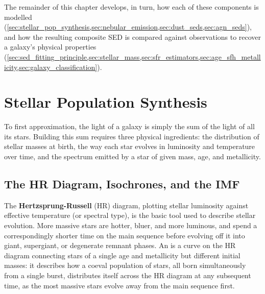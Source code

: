 \medskip

The remainder of this chapter develops, in turn, how each of these components is modelled (\cref{sec:stellar_pop_synthesis,sec:nebular_emission,sec:dust_seds,sec:agn_seds}), and how the resulting composite SED is compared against observations to recover a galaxy's physical properties (\cref{sec:sed_fitting_principle,sec:stellar_mass,sec:sfr_estimators,sec:age_sfh_metallicity,sec:galaxy_classification}).

\section{Stellar Population Synthesis} \label{sec:stellar_pop_synthesis}

To first approximation, the light of a galaxy is simply the sum of the light of all its stars. Building this sum requires three physical ingredients: the distribution of stellar masses at birth, the way each star evolves in luminosity and temperature over time, and the spectrum emitted by a star of given mass, age, and metallicity.

\subsection{The HR Diagram, Isochrones, and the IMF} \label{subsec:hr_isochrones}

\begin{minipage}{0.56\textwidth}
The \textbf{Hertzsprung-Russell} (HR) diagram, plotting stellar luminosity against effective temperature (or spectral type), is the basic tool used to describe stellar evolution. More massive stars are hotter, bluer, and more luminous, and spend a correspondingly shorter time on the main sequence before evolving off it into giant, supergiant, or degenerate remnant phases. An  is a curve on the HR diagram connecting stars of a single age and metallicity but different initial masses: it describes how a coeval population of stars, all born simultaneously from a single burst, distributes itself across the HR diagram at any subsequent time, as the most massive stars evolve away from the main sequence first.
\end{minipage}%
\hfill
\begin{minipage}{0.4\textwidth}
    \centering
\end{minipage}

